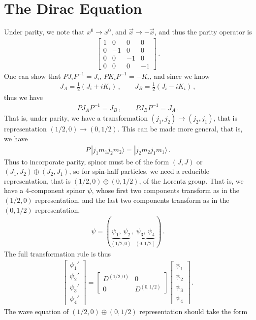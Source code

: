 \documentclass[11pt, onesided]{book}
\theoremstyle{break}
\theoremstyle{break}
\newcommand{\bmat}[1]{\begin{bmatrix} #1 \end{bmatrix}}
\begin{document}
\section[The Dirac Equation]{\color{red}The Dirac Equation\color{black}}
Under parity, we note that $x^0 \to x^0$, and $\vec{x}\to -\vec{x}$, and thus the parity operator is
\begin{align*}
\bmat{1 & 0 & 0 & 0\\
0 & -1 & 0 & 0\\
0 & 0 & -1 & 0\\
0 & 0 & 0 & -1}\,.
\end{align*}
One can show that $PJ_iP^{-1} = J_i$, $PK_iP^{-1} = -K_i$, and since we know
\begin{align*}
J_A = \frac{1}{2}(J_i + iK_i) \,,\qquad
J_B = \frac{1}{2}(J_i - iK_i)\,,
\end{align*}
thus we have
\begin{align*}
PJ_AP^{-1} = J_B \,,\qquad
PJ_BP^{-1} = J_A\,.
\end{align*}
That is, under parity, we have a transformation $(j_1,j_2) \to (j_2,j_1)$, that is representation $(1/2,0) \to (0,1/2)$. This can be made more general, that is, we have
\begin{align*}
P\, |j_1m_1j_2m_2\rangle = |j_2m_2j_1m_1\rangle\,.
\end{align*}
Thus to incorporate parity, spinor must be of the form $(J,J)$ or $(J_1,J_2) \oplus (J_2, J_1)$, so for spin-half particles, we need a reducible representation, that is $(1/2,0) \oplus (0,1/2)$, of the Lorentz group. That is, we have a $4$-component spinor $\psi$, whose first two components transform as in the $(1/2,0)$ representation, and the last two components transform as in the $(0,1/2)$ representation,
\begin{align*}
\psi = (\underbrace{\psi_1,\,\psi_2}_{(1/2,0)},\, \underbrace{\psi_3,\,\psi_4}_{(0,1/2)})\,.
\end{align*}
The full transformation rule is thus
\begin{align*}
\bmat{\psi_1'\\ \psi_2' \\ \psi_3' \\ \psi_4'} = \bmat{D^{(1/2,0)} & 0 \\ 0 & D^{(0,1/2)}} \bmat{\psi_1\\ \psi_2 \\ \psi_3 \\ \psi_4}\,. 
\end{align*}
The wave equation of $(1/2,0) \oplus (0,1/2)$ representation should take the form
\end{document}
